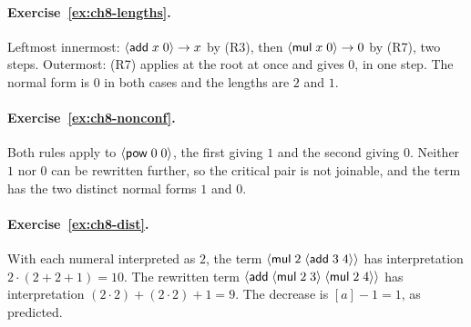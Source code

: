 \paragraph{Exercise~\ref{ex:ch8-lengths}.}
Leftmost innermost: $\langle \mathsf{add}\; x\; 0\rangle\to x$ by (R3), then $\langle \mathsf{mul}\; x\; 0\rangle\to0$ by (R7), two steps. Outermost: (R7) applies at the root at once and gives $0$, in one step. The normal form is $0$ in both cases and the lengths are $2$ and $1$.

\paragraph{Exercise~\ref{ex:ch8-nonconf}.}
Both rules apply to $\langle \mathsf{pow}\; 0\; 0\rangle$, the first giving $1$ and the second giving $0$. Neither $1$ nor $0$ can be rewritten further, so the critical pair is not joinable, and the term has the two distinct normal forms $1$ and $0$.

\paragraph{Exercise~\ref{ex:ch8-dist}.}
With each numeral interpreted as $2$, the term $\langle \mathsf{mul}\; 2\; \langle \mathsf{add}\; 3\; 4\rangle\rangle$ has interpretation $2\cdot(2+2+1)=10$. The rewritten term $\langle \mathsf{add}\; \langle \mathsf{mul}\; 2\; 3\rangle\; \langle \mathsf{mul}\; 2\; 4\rangle\rangle$ has interpretation $(2\cdot2)+(2\cdot2)+1=9$. The decrease is $[a]-1=1$, as predicted.
